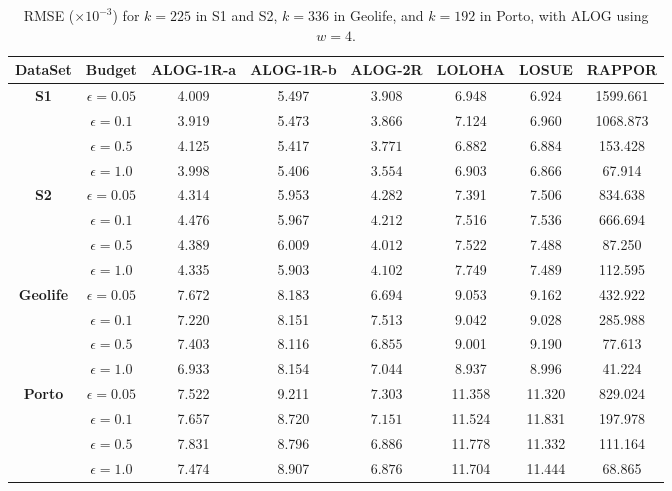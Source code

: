 \begin{table}
\centering
\caption{RMSE ($\times 10^{-3}$) for $k=225$ in S1 and S2, $k=336$ in Geolife, and $k=192$ in Porto, with ALOG using $w=4$.}
\begin{tabular}{c|c|cccccc}
\toprule
\textbf{DataSet} & \textbf{Budget}  & \textbf{ALOG-1R-a} & \textbf{ALOG-1R-b} & \textbf{ALOG-2R} & \textbf{LOLOHA} & \textbf{LOSUE} & \textbf{RAPPOR} \\
\midrule
\multirow{4}{*}{\textbf{S1}} 
& $\epsilon = 0.05$ & 4.009 & 5.497 & \cellcolor{black!8}$\mathbf{3.908}$  & 6.948  & 6.924  & 1599.661  \\
& $\epsilon = 0.1$  & 3.919  & 5.473  & \cellcolor{black!8}$\mathbf{3.866}$  & 7.124  & 6.960  & 1068.873  \\
& $\epsilon = 0.5$  & 4.125  & 5.417  & \cellcolor{black!8}$\mathbf{3.771}$  & 6.882  & 6.884  & 153.428  \\
& $\epsilon = 1.0$  & 3.998  & 5.406  & \cellcolor{black!8}$\mathbf{3.554}$  & 6.903  & 6.866  & 67.914  \\

\midrule
\multirow{3}{*}{\textbf{S2}} 
& $\epsilon = 0.05$ & 4.314  & 5.953  & \cellcolor{black!8}$\mathbf{4.282}$  & 7.391  & 7.506  & 834.638  \\
& $\epsilon = 0.1$  & 4.476  & 5.967  & \cellcolor{black!8}$\mathbf{4.212}$  & 7.516  & 7.536  & 666.694  \\
& $\epsilon = 0.5$  & 4.389  & 6.009  & \cellcolor{black!8}$\mathbf{4.012}$  & 7.522  & 7.488  & 87.250  \\
& $\epsilon = 1.0$  & 4.335  & 5.903  & \cellcolor{black!8}$\mathbf{4.102}$  & 7.749  & 7.489  & 112.595  \\
\midrule

\multirow{3}{*}{\textbf{Geolife}} 
& $\epsilon = 0.05$ & 7.672  & 8.183  & \cellcolor{black!8}$\mathbf{6.694}$  & 9.053  & 9.162  & 432.922  \\
& $\epsilon = 0.1$  & \cellcolor{black!8}$\mathbf{7.220}$  & 8.151  & 7.513  & 9.042  & 9.028  & 285.988  \\
& $\epsilon = 0.5$  & 7.403  & 8.116  & \cellcolor{black!8}$\mathbf{6.855}$  & 9.001  & 9.190  & 77.613  \\
& $\epsilon = 1.0$  & \cellcolor{black!8}$\mathbf{6.933}$  & 8.154  & 7.044  & 8.937  & 8.996  & 41.224  \\

\midrule
\multirow{3}{*}{\textbf{Porto}}
& $\epsilon = 0.05$ & 7.522  & 9.211  & \cellcolor{black!8}$\mathbf{7.303}$  & 11.358  & 11.320  & 829.024  \\
& $\epsilon = 0.1$  & 7.657  & 8.720  & \cellcolor{black!8}$\mathbf{7.151}$  & 11.524  & 11.831  & 197.978  \\
& $\epsilon = 0.5$  & 7.831  & 8.796  & \cellcolor{black!8}$\mathbf{6.886}$  & 11.778  & 11.332  & 111.164  \\
& $\epsilon = 1.0$  & 7.474  & 8.907  & \cellcolor{black!8}$\mathbf{6.876}$  & 11.704  & 11.444  & 68.865  \\

\bottomrule
\end{tabular}
\label{tab:mse_budge}
\end{table}

